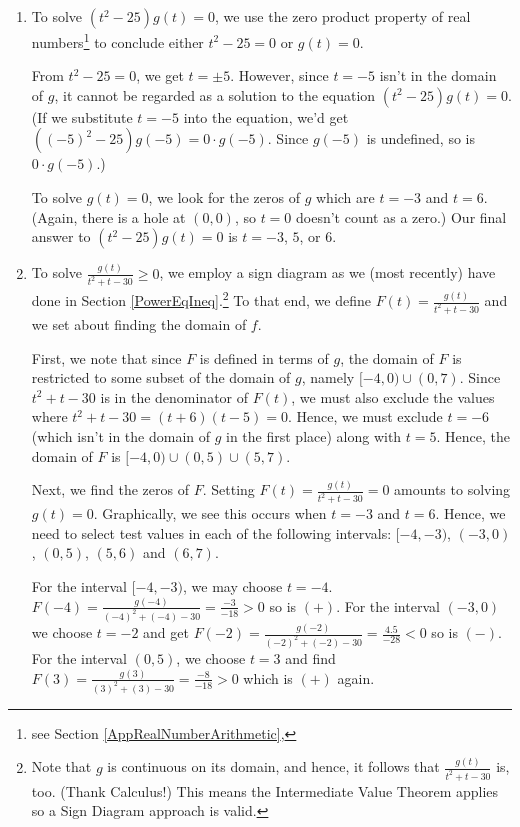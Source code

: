 \documentclass{ximera}
\begin{document}
\begin{example}
\begin{explanation}
\begin{enumerate}
\item To solve $(t^2-25) g(t) = 0$, we use the zero product property of real numbers\footnote{see Section \ref{AppRealNumberArithmetic}, \pageref{propertiesofzero}} to conclude either $t^2-25 = 0$ or $g(t) = 0$.  



From $t^2-25 = 0$, we get $t = \pm 5$.  However, since $t=-5$ isn't in the domain of $g$, it cannot be regarded as a solution to the equation $(t^2-25)g(t) = 0$.  (If we substitute $t=-5$ into the equation, we'd get $((-5)^2-25)g(-5) = 0 \cdot g(-5)$.  Since  $g(-5)$ is undefined, so is $0 \cdot g(-5)$.)  



To solve $g(t) = 0$, we look for the zeros of $g$ which are $t = -3$ and $t = 6$. (Again, there is a hole at $(0,0)$, so $t=0$ doesn't count as a zero.)  Our final answer to $(t^2-25)g(t) = 0$ is $t = -3$, $5$, or $6$.

\item To solve  $\frac{g(t)}{t^2+t-30} \geq 0$, we employ a sign diagram as we (most recently) have done in Section \ref{PowerEqIneq}.\footnote{Note that $g$ is continuous on its domain, and hence, it follows that  $\frac{g(t)}{t^2+t-30}$ is, too.  (Thank Calculus!)  This means the Intermediate Value Theorem applies so a Sign Diagram approach is valid.}  To that end, we define $F(t) = \frac{g(t)}{t^2+t-30}$ and we set about finding the domain of $f$.



First, we note that since $F$ is defined in terms of $g$, the domain of $F$ is restricted to some subset of the domain of $g$, namely $[-4, 0) \cup (0, 7)$.  Since  $t^2+t-30$ is in the denominator of $F(t)$, we must also exclude the values where $t^2+t-30 = (t+6)(t-5) = 0$.  Hence, we must exclude $t = -6$ (which isn't in the domain of $g$ in the first place) along with $t = 5$.  Hence, the domain of $F$ is $[-4, 0) \cup (0, 5) \cup (5,7)$.



Next, we find the zeros of $F$.  Setting $F(t) = \frac{g(t)}{t^2+t-30} = 0$ amounts to solving $g(t) = 0$. Graphically, we see this occurs when $t = -3$ and $t = 6$.  Hence, we need to select test values in each of the following intervals:  $[-4, -3)$, $(-3,0)$, $(0,5)$, $(5,6)$ and $(6, 7)$.  



For the interval $[-4,-3)$, we may choose $t=-4$.  $F(-4) = \frac{g(-4)}{(-4)^2+(-4)-30} = \frac{-3}{-18}>0$ so is $(+)$.  For the interval $(-3,0)$ we choose $t = -2$ and get $F(-2) = \frac{g(-2)}{(-2)^2+(-2) - 30} = \frac{4.5}{-28} < 0$ so is $(-)$.  For the interval $(0,5)$, we choose $t = 3$ and find $F(3) = \frac{g(3)}{(3)^2+(3) - 30} = \frac{-8}{-18}>0$ which is $(+)$ again.  




\end{enumerate}
\end{explanation}
\end{example}
\end{document}
